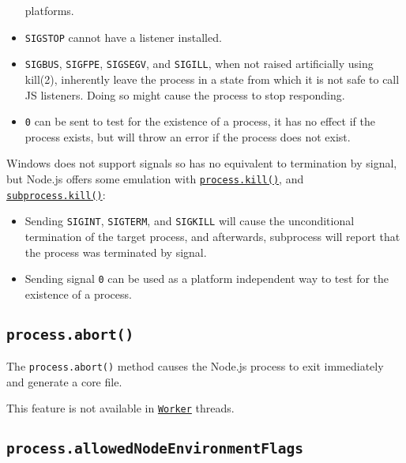 \begin{itemize}
  platforms.
\item
  \texttt{\textquotesingle{}SIGSTOP\textquotesingle{}} cannot have a
  listener installed.
\item
  \texttt{\textquotesingle{}SIGBUS\textquotesingle{}},
  \texttt{\textquotesingle{}SIGFPE\textquotesingle{}},
  \texttt{\textquotesingle{}SIGSEGV\textquotesingle{}}, and
  \texttt{\textquotesingle{}SIGILL\textquotesingle{}}, when not raised
  artificially using kill(2), inherently leave the process in a state
  from which it is not safe to call JS listeners. Doing so might cause
  the process to stop responding.
\item
  \texttt{0} can be sent to test for the existence of a process, it has
  no effect if the process exists, but will throw an error if the
  process does not exist.
\end{itemize}

Windows does not support signals so has no equivalent to termination by
signal, but Node.js offers some emulation with
\hyperref[processkillpid-signal]{\texttt{process.kill()}}, and
\href{child_process.md\#subprocesskillsignal}{\texttt{subprocess.kill()}}:

\begin{itemize}
\tightlist
\item
  Sending \texttt{SIGINT}, \texttt{SIGTERM}, and \texttt{SIGKILL} will
  cause the unconditional termination of the target process, and
  afterwards, subprocess will report that the process was terminated by
  signal.
\item
  Sending signal \texttt{0} can be used as a platform independent way to
  test for the existence of a process.
\end{itemize}

\subsection{\texorpdfstring{\texttt{process.abort()}}{process.abort()}}\label{process.abort}

The \texttt{process.abort()} method causes the Node.js process to exit
immediately and generate a core file.

This feature is not available in
\href{worker_threads.md\#class-worker}{\texttt{Worker}} threads.

\subsection{\texorpdfstring{\texttt{process.allowedNodeEnvironmentFlags}}{process.allowedNodeEnvironmentFlags}}\label{process.allowednodeenvironmentflags}

